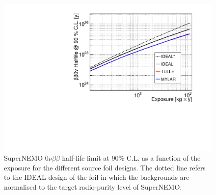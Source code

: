 \documentclass[main.tex]{subfiles}
\begin{document}
\begin{figure}[h!]
\centering
\includegraphics[scale=0.75]{pictures/Chap4/SensVsExposure.pdf}

\caption{SuperNEMO 0$\nu\beta\beta$ half-life limit at 90\% C.L. as a function of the exposure for the different source foil designs. The dotted line refers to the IDEAL design of the foil in which the backgrounds are normalised to the target radio-purity level of SuperNEMO.}
\label{SensVsExposure3Designs}
\end{figure}




\end{document}
